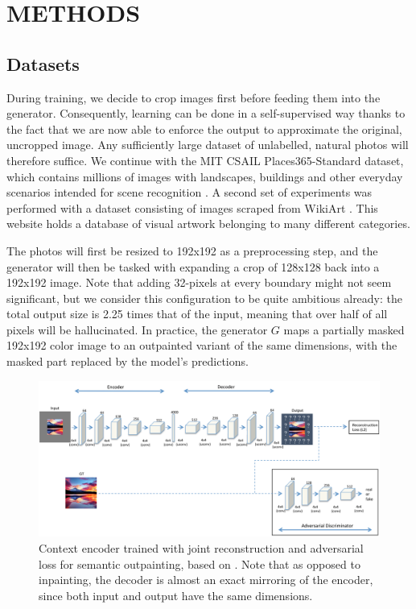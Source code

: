 \documentclass[twocolumn,showpacs,%
  nofootinbib,aps,superscriptaddress,%
  eqsecnum,prd,notitlepage,showkeys,10pt]{revtex4-1}
\begin{document}
\section{METHODS}

\subsection{Datasets}

\hspace{\parindent} During training, we decide to crop images first before feeding them into the generator. Consequently, learning can be done in a self-supervised way thanks to the fact that we are now able to enforce the output to approximate the original, uncropped image. Any sufficiently large dataset of unlabelled, natural photos will therefore suffice. We continue with the MIT CSAIL Places365-Standard dataset, which contains millions of images with landscapes, buildings and other everyday scenarios intended for scene recognition \cite{Zhou2018}. A second set of experiments was performed with a dataset consisting of images scraped from WikiArt \cite{wikiart}. This website holds a database of visual artwork belonging to many different categories.

The photos will first be resized to 192x192 as a preprocessing step, and the generator will then be tasked with expanding a crop of 128x128 back into a 192x192 image. Note that adding 32-pixels at every boundary might not seem significant, but we consider this configuration to be quite ambitious already: the total output size is 2.25 times that of the input, meaning that over half of all pixels will be hallucinated. In practice, the generator $G$ maps a partially masked 192x192 color image to an outpainted variant of the same dimensions, with the masked part replaced by the model's predictions.

\begin{figure}[tp]
  \centering
  \begin{adjustbox}{center}
  \includegraphics[width=\textwidth]{MyArch}
  \end{adjustbox}
  \caption{Context encoder trained with joint reconstruction and adversarial loss for semantic outpainting, based on \cite{Pathak2016}. Note that as opposed to inpainting, the decoder is almost an exact mirroring of the encoder, since both input and output have the same dimensions.}
  \label{fig:MyArch}
\end{figure}
\end{document}
